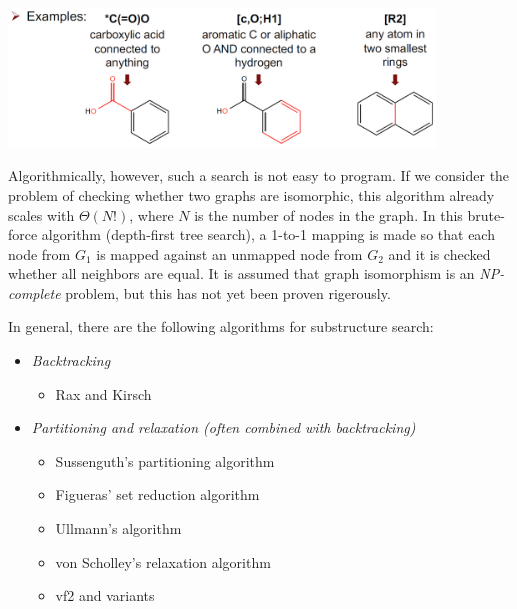 \begin{center}\includegraphics[width=0.85\textwidth]{img/cheminformatics/SubstructureSmartsExample.png}\end{center}

Algorithmically, however, such a search is not easy to program. If we consider the problem of checking whether two graphs are isomorphic, this algorithm already scales with $\Theta(N!)$, where $N$ is the number of nodes in the graph. In this brute-force algorithm (depth-first tree search), a 1-to-1 mapping is made so that each node from $G_1$ is mapped against an unmapped node from $G_2$ and it is checked whether all neighbors are equal. It is assumed that graph isomorphism is an \emph{NP-complete} problem, but this has not yet been proven rigerously.


In general, there are the following algorithms for substructure search:

\begin{itemize}
    \item \emph{Backtracking}
    \begin{itemize}
        \item Rax and Kirsch 
    \end{itemize}
    \item \emph{Partitioning and relaxation (often combined with backtracking)}
    \begin{itemize}
        \item Sussenguth’s partitioning algorithm 
        \item Figueras’ set reduction algorithm 
        \item Ullmann’s algorithm 
        \item von Scholley’s relaxation algorithm 
        \item vf2 and variants 
    \end{itemize}
\end{itemize}

